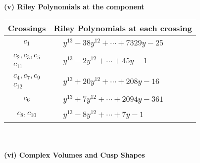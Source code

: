 \documentclass[1p]{elsarticle_modified}
\theoremstyle{definition}
\begin{document}
\newpage\renewcommand{\arraystretch}{1}
\flushleft \textbf{(v) Riley Polynomials at the component}\newline \\
\begin{tabular}{m{50pt}|m{274pt}}
Crossings & \hspace{64pt}Riley Polynomials at each crossing \\
\hline $$\begin{aligned}c_{1}\end{aligned}$$&$\begin{aligned}
&y^{13}-38 y^{12}+\cdots+7329 y-25
\end{aligned}$\\
\hline $$\begin{aligned}c_{2},c_{3},c_{5}\\c_{11}\end{aligned}$$&$\begin{aligned}
&y^{13}-2 y^{12}+\cdots+45 y-1
\end{aligned}$\\
\hline $$\begin{aligned}c_{4},c_{7},c_{9}\\c_{12}\end{aligned}$$&$\begin{aligned}
&y^{13}+20 y^{12}+\cdots+208 y-16
\end{aligned}$\\
\hline $$\begin{aligned}c_{6}\end{aligned}$$&$\begin{aligned}
&y^{13}+7 y^{12}+\cdots+2094 y-361
\end{aligned}$\\
\hline $$\begin{aligned}c_{8},c_{10}\end{aligned}$$&$\begin{aligned}
&y^{13}-8 y^{12}+\cdots+7 y-1
\end{aligned}$\\
\hline
\end{tabular}\\~\\
\newpage\flushleft \textbf{(vi) Complex Volumes and Cusp Shapes}
\end{document}
